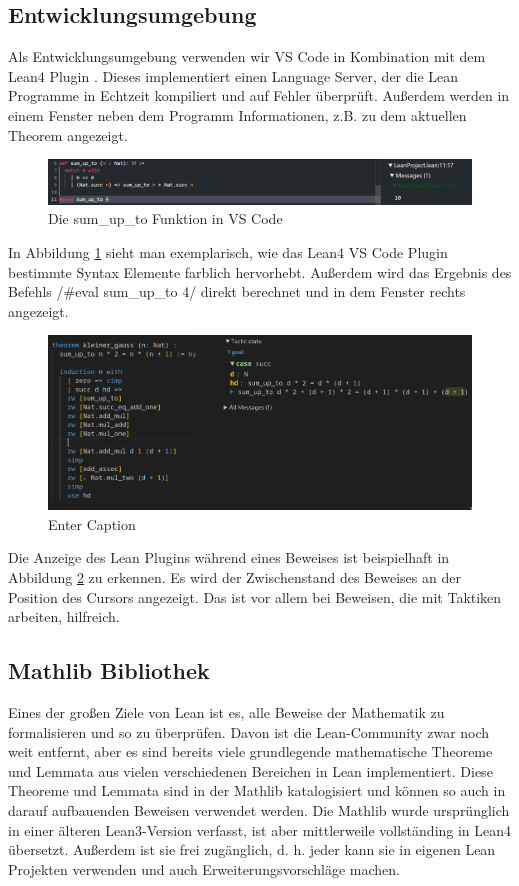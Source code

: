 \documentclass[10pt]{article}
\begin{document}
\subsection{Entwicklungsumgebung}
Als Entwicklungsumgebung verwenden wir VS Code in Kombination mit dem Lean4 Plugin \cite{Q3}. Dieses implementiert einen Language Server, der die Lean Programme in Echtzeit kompiliert und auf Fehler überprüft. Außerdem werden in einem Fenster neben dem Programm Informationen, z.B. zu dem aktuellen Theorem angezeigt.
\begin{figure}[H]
    \centering
    \includegraphics[width=0.95\linewidth]{Abbildung sum_up_to.png}
    \caption{Die sum\_up\_to Funktion in VS Code}
    \label{Abb sum_up_to}
\end{figure}
\vspace{-0.2cm}
\noindent In Abbildung \ref{Abb sum_up_to} sieht man exemplarisch, wie das Lean4 VS Code Plugin bestimmte Syntax Elemente farblich hervorhebt. Außerdem wird das Ergebnis des Befehls \lean/#eval sum_up_to 4/ direkt berechnet und in dem Fenster rechts angezeigt.
\vspace{-0.2cm}
\hspace{-0.4cm}
\begin{figure}[H]
    \centering
    \includegraphics[width=0.65\linewidth]{kleiner_gauss.png}
    \caption{Enter Caption}
    \label{Abb Enter Caption}
\end{figure}
\noindent Die Anzeige des Lean Plugins während eines Beweises ist beispielhaft in Abbildung \ref{Abb Enter Caption} zu erkennen. Es wird der Zwischenstand des Beweises an der Position des Cursors angezeigt. Das ist vor allem bei Beweisen, die mit Taktiken arbeiten, hilfreich.

\subsection{Mathlib Bibliothek}
Eines der großen Ziele von Lean ist es, alle Beweise der Mathematik zu formalisieren und so zu überprüfen. Davon ist die Lean-Community zwar noch weit entfernt, aber es sind bereits viele grundlegende mathematische Theoreme und Lemmata aus vielen verschiedenen Bereichen in Lean implementiert. Diese Theoreme und Lemmata sind in der Mathlib \cite{Q10} katalogisiert und können so auch in darauf aufbauenden Beweisen verwendet werden. Die Mathlib wurde ursprünglich in einer älteren Lean3-Version verfasst, ist aber mittlerweile vollständing in Lean4 übersetzt. Außerdem ist sie frei zugänglich, d. h. jeder kann sie in eigenen Lean Projekten verwenden und auch Erweiterungsvorschläge machen.
\end{document}
